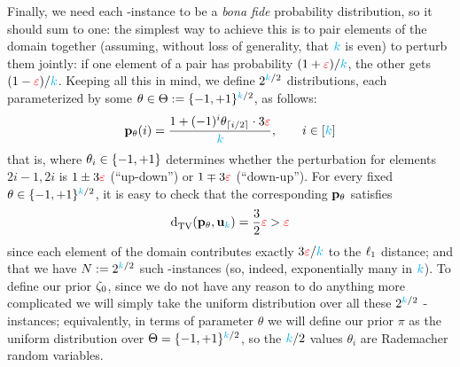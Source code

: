 Finally, we need each \no-instance to be a \emph{bona fide} probability distribution, so it should sum to one: the simplest way to achieve this is to pair elements of the domain together (assuming, without loss of generality, that $\ab$ is even) to perturb them jointly: if one element of a pair has probability $(1+\dst)/\ab$, the other gets $(1-\dst)/\ab$. Keeping all this in mind, we define $2^{\ab/2}$ distributions, each parameterized by some $\theta\in\Theta \eqdef \bool^{\ab/2}$, as follows:
\begin{equation}
	\label{eq:paninski:construction}
	\p_\theta(i) = 
		\frac{1+(-1)^i\theta_{\clg{i/2}} \cdot 3\dst}{\ab}, \qquad i\in[\ab]
\end{equation}
that is, where $\theta_i\in\bool$ determines whether the perturbation for elements $2i-1,2i$ is $1\pm3\dst$ (``up-down'') or  $1\mp3\dst$ (``down-up''). For every fixed $\theta\in\bool^{\ab/2}$, it is easy to check that the corresponding $\p_\theta$ satisfies
\begin{equation}
	\label{eq:paninski:construction:distance}
	\totalvardist{\p_\theta}{\uniform_\ab} = \frac{3}{2}\dst > \dst
\end{equation}
since each element of the domain contributes exactly $3\dst/\ab$ to the $\lp[1]$ distance; and that we have $N\eqdef 2^{\ab/2}$ such \no-instances (so, indeed, exponentially many in $\ab$). To define our prior $\zeta_\reject$, since we do not have any reason to do anything more complicated we will simply take the uniform distribution over all these $2^{\ab/2}$ \no-instances; equivalently, in terms of parameter $\theta$ we will define our prior $\pi$ as the uniform distribution over $\Theta=\bool^{\ab/2}$, so the $\ab/2$ values $\theta_i$ are \iid Rademacher random variables.



